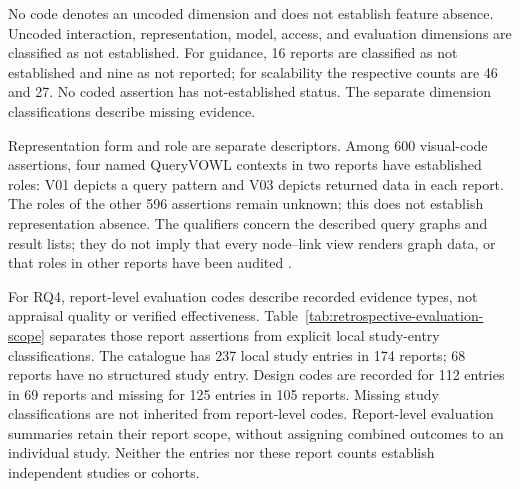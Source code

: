 \documentclass[manuscript,review,screen]{acmart}
\begin{document}
No code denotes an uncoded dimension and does not establish feature absence. Uncoded interaction, representation, model, access, and evaluation dimensions are classified as not established. For guidance, 16 reports are classified as not established and nine as not reported; for scalability the respective counts are 46 and 27. No coded assertion has not-established status. The separate dimension classifications describe missing evidence.

Representation form and role are separate descriptors. Among 600 visual-code assertions, four named QueryVOWL contexts in two reports have established roles: V01 depicts a query pattern and V03 depicts returned data in each report. The roles of the other 596 assertions remain unknown; this does not establish representation absence. The qualifiers concern the described query graphs and result lists; they do not imply that every node--link view renders graph data, or that roles in other reports have been audited \citep{V3-02190,V3-02191}.

For RQ4, report-level evaluation codes describe recorded evidence types, not appraisal quality or verified effectiveness. Table~\ref{tab:retrospective-evaluation-scope} separates those report assertions from explicit local study-entry classifications. The catalogue has 237 local study entries in 174 reports; 68 reports have no structured study entry. Design codes are recorded for 112 entries in 69 reports and missing for 125 entries in 105 reports. Missing study classifications are not inherited from report-level codes. Report-level evaluation summaries retain their report scope, without assigning combined outcomes to an individual study. Neither the entries nor these report counts establish independent studies or cohorts.
\end{document}

